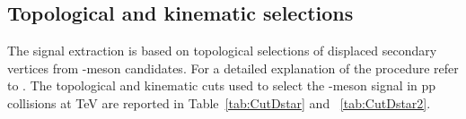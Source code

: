   
  

\subsection{Topological and kinematic selections}

The \Dstar signal extraction is based on topological selections of displaced secondary vertices from \Dzero -meson candidates. For a detailed explanation of the procedure refer to \cite{Adam:2015sza}. The topological and kinematic cuts used to select the \Dstar -meson signal in pp collisions at  TeV are reported in Table~\ref{tab:CutDstar} and ~\ref{tab:CutDstar2}.



